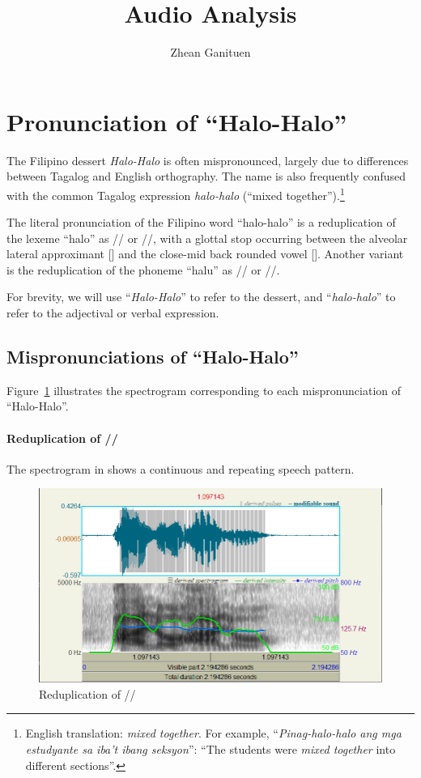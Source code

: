 \documentclass{article}
\title{Audio Analysis}
\author{Zhean Ganituen}
\begin{document}
\maketitle

\section{Pronunciation of ``Halo-Halo''}

The Filipino dessert \emph{Halo-Halo} is often mispronounced, largely due to
differences between Tagalog and English orthography. The name is also
frequently confused with the common Tagalog expression \emph{halo-halo}
(``mixed together'').\footnote{English translation: \emph{mixed together}. For
    example, ``\emph{Pinag-halo-halo ang mga estudyante sa iba't ibang seksyon}'':
    ``The students were \emph{mixed together} into different sections''.}

The literal pronunciation of the Filipino word ``halo-halo'' is a reduplication
of the lexeme ``halo'' as // or //, with a glottal
stop occurring between the alveolar lateral approximant [] and the
close-mid back rounded vowel []. Another variant is the
reduplication of the phoneme ``halu'' as // or //.

For brevity, we will use ``\emph{Halo-Halo}'' to refer to the dessert, and
``\emph{halo-halo}'' to refer to the adjectival or verbal expression.

\subsection{Mispronunciations of ``Halo-Halo''}

Figure~\ref{fig:halo} illustrates the spectrogram corresponding to each
mispronunciation of ``Halo-Halo''.

\paragraph{Reduplication of //} The spectrogram in
 shows a continuous and repeating speech pattern.

\begin{figure}
    \centering
    \includegraphics[width=0.65\linewidth]{img/halo.png}
    \caption{Reduplication of //}\label{fig:halo}
\end{figure}
\end{document}
